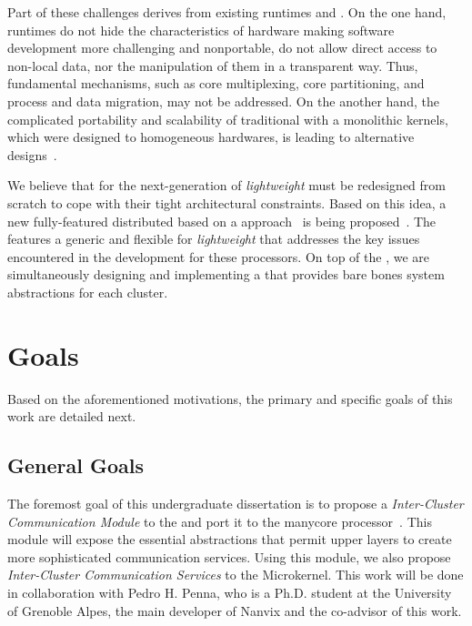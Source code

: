 	Part of these challenges derives from existing runtimes and \oses.
	On the one hand, runtimes do not hide the characteristics of hardware making
	software development more challenging and nonportable, \eg do not allow
	direct access to non-local data, nor the manipulation of them in a transparent way.
	Thus, fundamental \os mechanisms, such as core multiplexing, core partitioning,
	and process and data migration, may not be addressed.
	On the another hand, the complicated portability and scalability of traditional \oses with a
	monolithic kernels, which were designed to homogeneous hardwares, is leading to alternative
	\os designs~\cite{Baumann2009, kluge2014, nightingale2009, rhoden2011}.

	We believe that \oses for the next-generation of \textit{lightweight} \manycores must be
	redesigned from scratch to cope with their tight architectural constraints.
	Based on this idea, a new fully-featured distributed \os based on a \multikernel approach~\cite{Baumann2009}
	is being proposed~\cite{penna2017-1,penna2017-2,penna2019}.
	The \nanvix \multikernel features a generic and flexible \hal for \textit{lightweight} \manycores that
	addresses the key issues encountered in the development for these processors.
	On top of the \nanvix \hal, we are simultaneously designing and implementing a \microkernel
	that provides bare bones system abstractions for each cluster.

\section{Goals}
\label{sec.goals}

	Based on the aforementioned motivations, the primary and specific goals of this work are detailed next.

\subsection{General Goals}
\label{sec.goals.general}

	The foremost goal of this undergraduate dissertation is to propose a \textit{Inter-Cluster Communication Module}
	to the \nanvix \hal and port it to the \mppa manycore processor~\cite{DeDinechin2013-1}.
	This module will expose the essential abstractions that permit upper layers to create more
	sophisticated communication services.
	Using this module, we also propose \textit{Inter-Cluster Communication Services} to the \nanvix Microkernel.
	This work will be done in collaboration with Pedro H. Penna, who is a Ph.D. student at the
	University of Grenoble Alpes, the main developer of Nanvix and the co-advisor of this work.

